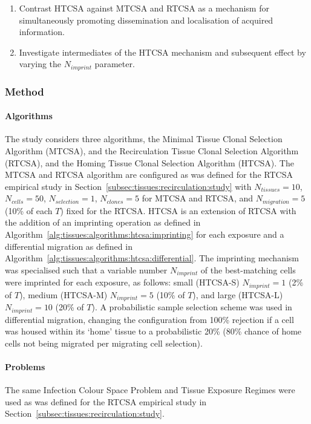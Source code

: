 \begin{enumerate}
	\item Contrast HTCSA against MTCSA and RTCSA as a mechanism for simultaneously promoting dissemination and localisation of acquired information.
	\item Investigate intermediates of the HTCSA mechanism and subsequent effect by varying the $N_{imprint}$ parameter.
\end{enumerate}


%
%
\subsubsection{Method}

%
%
\paragraph{Algorithms}
The study considers three algorithms, the Minimal Tissue Clonal Selection Algorithm (MTCSA), and the Recirculation Tissue Clonal Selection Algorithm (RTCSA), and the Homing Tissue Clonal Selection Algorithm (HTCSA). 
The MTCSA and RTCSA algorithm are configured as was defined for the RTCSA empirical study in Section~\ref{subsec:tissues:recirculation:study} with $N_{tissues}=10$, $N_{cells}=50$, $N_{selection}=1$, $N_{clones}=5$ for MTCSA and RTCSA, and $N_{migration}=5$ (10\% of each $T$) fixed for the RTCSA.
HTCSA is an extension of RTCSA with the addition of an imprinting operation as defined in Algorithm~\ref{alg:tissues:algorithms:htcsa:imprinting} for each exposure and a differential migration as defined in Algorithm~\ref{alg:tissues:algorithms:htcsa:differential}. The imprinting mechanism was specialised such that a variable number $N_{imprint}$ of the best-matching cells were imprinted for each exposure, as follows: small (HTCSA-S) $N_{imprint}=1$ (2\% of $T$), medium (HTCSA-M) $N_{imprint}=5$ (10\% of $T$), and large (HTCSA-L) $N_{imprint}=10$ (20\% of $T$). A probabilistic sample selection scheme was used in differential migration, changing the configuration from 100\% rejection if a cell was housed within its `home' tissue to a probabilistic 20\% (80\% chance of home cells not being migrated per migrating cell selection). 

%
%
\paragraph{Problems}
The same Infection Colour Space Problem and Tissue Exposure Regimes were used as was defined for the RTCSA empirical study in Section~\ref{subsec:tissues:recirculation:study}.

